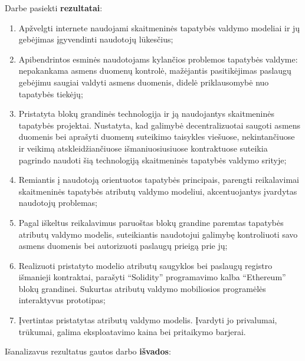 
Darbe pasiekti \textbf{rezultatai}:

\begin{enumerate}
    \item Apžvelgti internete
    naudojami skaitmeninės tapatybės valdymo modeliai ir jų gebėjimas įgyvendinti naudotojų lūkesčius;
    \item Apibendrintos esminės naudotojams kylančios problemos tapatybės valdyme: nepakankama asmens duomenų
    kontrolė, mažėjantis pasitikėjimas paslaugų gebėjimu saugiai valdyti asmens duomenis, didelė priklausomybė nuo tapatybės tiekėjų;
    \item Pristatyta blokų grandinės technologija ir ją naudojantys skaitmeninės tapatybės projektai.
    Nustatyta, kad galimybė
    decentralizuotai saugoti asmens duomenis bei aprašyti duomenų suteikimo taisykles viešuose, nekintančiuose
    ir veikimą atskleidžiančiuose išmaniuosiusiuose
    kontraktuose suteikia pagrindo
    naudoti šią technologiją skaitmeninės tapatybės valdymo srityje;
    \item Remiantis į naudotoją orientuotos tapatybės principais,
    parengti reikalavimai skaitmeninės tapatybės atributų valdymo modeliui, akcentuojantys įvardytas naudotojų problemas;
    \item Pagal iškeltus reikalavimus paruoštas blokų grandine paremtas tapatybės atributų valdymo modelis, suteikiantis naudotojui galimybę kontroliuoti savo asmens duomenis
    bei autorizuoti paslaugų prieigą prie jų;
    \item Realizuoti pristatyto modelio atributų saugyklos bei paslaugų registro išmanieji kontraktai, parašyti \enquote{Solidity} programavimo kalba \enquote{Ethereum} blokų grandinei.
    Sukurtas atributų valdymo mobiliosios programėlės interaktyvus prototipas;
    \item Įvertintas pristatytas atributų valdymo modelis. Įvardyti jo privalumai, trūkumai,
    galima eksploatavimo kaina bei pritaikymo barjerai.
\end{enumerate}

Išanalizavus rezultatus gautos darbo \textbf{išvados}:

